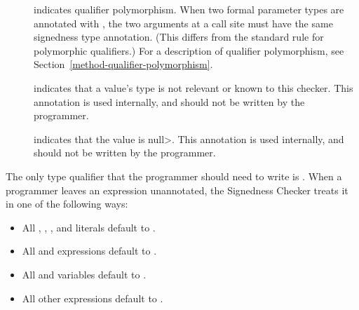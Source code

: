 \begin{description}
 \item[]
   indicates qualifier polymorphism.
   When two formal parameter types are annotated with
   , the two arguments
   at a call site
   must have the same signedness type annotation.  (This differs from the
   standard rule for polymorphic qualifiers.)
   For a description of qualifier polymorphism, see
   Section~\ref{method-qualifier-polymorphism}.

\item[]
    indicates that a value's type is not relevant or known to this checker.
    This annotation is used internally, and should not be
    written by the programmer.

\item[]
  indicates that the value is \<null>.
    This annotation is used internally, and should not
    be written by the programmer.

\end{description}



The only type qualifier that the programmer should need to write is
.
When a programmer leaves an expression unannotated, the
Signedness Checker treats it in one of the following ways:

\begin{itemize}

    \item
    All , , , and  literals default
    to .
    \item
    All  and  expressions default to
    .
    \item
    All  and  variables default to
    .
    \item
    All other expressions default to .

\end{itemize}


